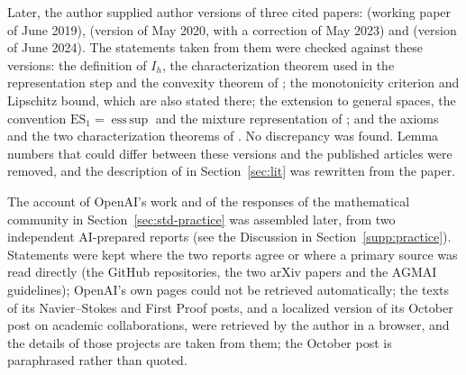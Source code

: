 Later, the author supplied author versions of three cited papers: \citet{www2020} (working paper of June 2019),
\citet{www2020b} (version of May 2020, with a correction of May 2023) and \citet{hlw2025} (version of June 2024).
The statements taken from them were checked against these versions: the definition of $I_h$, the
characterization theorem used in the representation step and the convexity theorem of \citet{www2020}; the
monotonicity criterion and Lipschitz bound, which are also stated there; the extension to general spaces, the
convention $\mathrm{ES}_1=\operatorname{ess\,sup}$ and the mixture representation of \citet{www2020b}; and the
axioms and the two characterization theorems of \citet{hlw2025}. No discrepancy was found. Lemma numbers that
could differ between these versions and the published articles were removed, and the description of
\citet{hlw2025} in Section~\ref{sec:lit} was rewritten from the paper.

The account of OpenAI's work and of the responses of the mathematical community in
Section~\ref{sec:std-practice} was assembled later, from two independent AI-prepared reports (see the Discussion in
Section~\ref{supp:practice}). Statements were kept where the two reports agree or where a primary source was read
directly (the GitHub repositories, the two arXiv papers and the AGMAI guidelines); OpenAI's own pages could not be
retrieved automatically; the texts of its Navier--Stokes and First Proof posts, and a localized version of its October post on academic
collaborations, were retrieved by the author in a browser, and the details of those projects are taken from them;
the October post is paraphrased rather than quoted.
